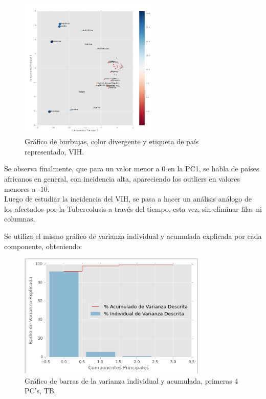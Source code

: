 \documentclass[letter, 10pt]{article}
\begin{document}
\begin{figure}[H]
\begin{center}
\includegraphics[width=0.6\textwidth]{Images/6bub2.png}
\caption{Gráfico de burbujas, color divergente y etiqueta de país representado, VIH.}
\end{center}
\end{figure}

Se observa finalmente, que para un valor menor a 0 en la PC1, se habla de países africanos en general, con incidencia alta, apareciendo los outliers en valores menores a -10.\\

Luego de estudiar la incidencia del VIH, se pasa a hacer un análisis análogo de los afectados por la Tubercolusis a través del tiempo, esta vez, sin eliminar filas ni columnas.


Se utiliza el mismo gráfico de varianza individual y acumulada explicada por cada componente, obteniendo:

\begin{figure}[H]
\begin{center}
\includegraphics[width=0.8\textwidth]{Images/2-1var.png}
\caption{Gráfico de barras de la varianza individual y acumulada, primeras 4 PC's, TB.}
\end{center}
\end{figure}
\end{document}
